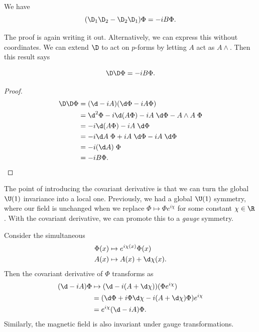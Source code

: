 \documentclass[a4paper]{article}
\begin{document}
\begin{prop}
  We have
  \[
    (\D_1 \D_2 - \D_2 \D_1) \Phi = - i B \Phi.
  \]
\end{prop}

The proof is again writing it out. Alternatively, we can express this without coordinates. We can extend $\D$ to act on $p$-forms by letting $A$ act as $A \wedge$. Then this result says
\begin{prop}
  \[
    \D \D \Phi = -i B \Phi.
  \]
\end{prop}

\begin{proof}
  \begin{align*}
    \D \D \Phi &= (\d - iA) (\d \Phi - iA\Phi)\\
    &= \d^2 \Phi - i \d (A \Phi) - iA\;\d \Phi - A \wedge A\;\Phi\\
    &= -i \d (A \Phi) - i A \;\d \Phi\\
    &= -i \d A\; \Phi + i A \;\d \Phi - i A\;\d \Phi\\
    &= -i (\d A)\; \Phi\\
    &= -i B \Phi.
  \end{align*}
\end{proof}

The point of introducing the covariant derivative is that we can turn the global $\U(1)$ invariance into a local one. Previously, we had a global $\U(1)$ symmetry, where our field is unchanged when we replace $\Phi \mapsto \Phi e^{i \chi}$ for some constant $\chi \in \R$. With the covariant derivative, we can promote this to a \emph{gauge} symmetry.

Consider the simultaneous 
\begin{align*}
  \Phi(x) &\mapsto e^{i\chi(x)} \Phi(x)\\
  A(x) &\mapsto A(x) + \d \chi(x).
\end{align*}
Then the covariant derivative of $\Phi$ transforms as
\begin{align*}
  (\d - iA) \Phi &\mapsto (\d - i (A + \d \chi)) (\Phi e^{i \chi}) \\
  &= (\d \Phi + i \Phi \d \chi - i (A + \d \chi) \Phi) e^{i\chi} \\
  &= e^{i \chi} (\d - iA) \Phi.
\end{align*}
Similarly, the magnetic field is also invariant under gauge transformations.
\end{document}
